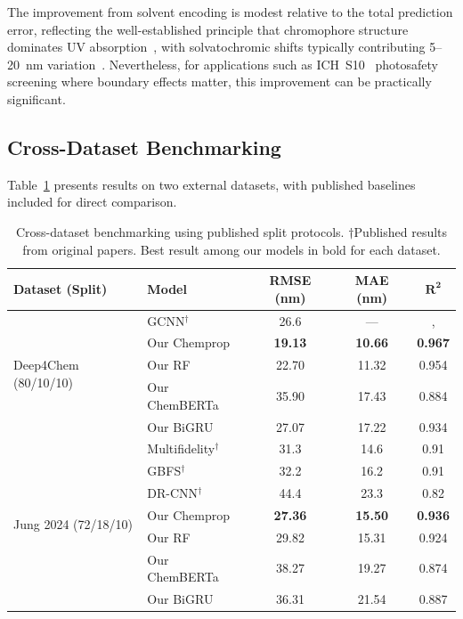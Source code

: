 \documentclass[journal=jcisd8,manuscript=article]{achemso}
\begin{document}
The improvement from solvent encoding is modest relative to the total prediction error, reflecting the well-established principle that chromophore structure dominates UV absorption~\cite{flemingMolecular2010}, with solvatochromic shifts typically contributing 5--20~nm variation~\cite{reichardt2011solvents}.
Nevertheless, for applications such as ICH~S10~\cite{ICH2013S10} photosafety screening where boundary effects matter, this improvement can be practically significant.


\subsection{Cross-Dataset Benchmarking}
\label{sec:cross_dataset}

Table~\ref{tab:cross_dataset} presents results on two external datasets, with published baselines included for direct comparison.

\begin{table}[htbp]
\centering
\caption{Cross-dataset benchmarking using published split protocols. $\dagger$Published results from original papers. Best result among our models in bold for each dataset.}
\label{tab:cross_dataset}
\begin{tabular}{llccc}
\toprule
\textbf{Dataset (Split)} & \textbf{Model} & \textbf{RMSE (nm)} & \textbf{MAE (nm)} & $\boldsymbol{R^2}$ \\
\midrule
\multirow{5}{*}{Deep4Chem (80/10/10)}
 & GCNN$^\dagger$ & 26.6 & --- &, \\
 & Our Chemprop & \textbf{19.13} & \textbf{10.66} & \textbf{0.967} \\
 & Our RF & 22.70 & 11.32 & 0.954 \\
 & Our ChemBERTa & 35.90 & 17.43 & 0.884 \\
 & Our BiGRU & 27.07 & 17.22 & 0.934 \\
\midrule
\multirow{7}{*}{Jung 2024 (72/18/10)}
 & Multifidelity$^\dagger$ & 31.3 & 14.6 & 0.91 \\
 & GBFS$^\dagger$ & 32.2 & 16.2 & 0.91 \\
 & DR-CNN$^\dagger$ & 44.4 & 23.3 & 0.82 \\
 & Our Chemprop & \textbf{27.36} & \textbf{15.50} & \textbf{0.936} \\
 & Our RF & 29.82 & 15.31 & 0.924 \\
 & Our ChemBERTa & 38.27 & 19.27 & 0.874 \\
 & Our BiGRU & 36.31 & 21.54 & 0.887 \\
\bottomrule
\end{tabular}
\end{table}
\end{document}
